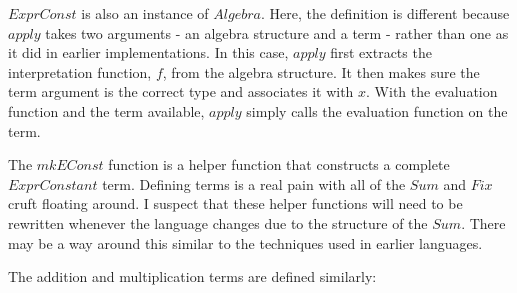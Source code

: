 \documentclass[10pt]{article}
\newcommand{\Conid}[1]{\mathit{#1}}
\newcommand{\Varid}[1]{\mathit{#1}}
\begin{document}
\ensuremath{\Conid{ExprConst}} is also an instance of \ensuremath{\Conid{Algebra}}.  Here, the definition is
different because \ensuremath{\Varid{apply}} takes two arguments - an algebra structure
and a term - rather than one as it did in earlier implementations.  In
this case, \ensuremath{\Varid{apply}} first extracts the interpretation function, \ensuremath{\Varid{f}},
from the algebra structure.  It then makes sure the term argument is
the correct type and associates it with \ensuremath{\Varid{x}}. With the evaluation
function and the term available, \ensuremath{\Varid{apply}} simply calls the
evaluation function on the term.

The \ensuremath{\Varid{mkEConst}} function is a helper function that constructs a
complete \ensuremath{\Conid{ExprConstant}} term.  Defining terms is a real pain with all
of the \ensuremath{\Conid{Sum}} and \ensuremath{\Conid{Fix}} cruft floating around.  I suspect that these
helper functions will need to be rewritten whenever the language
changes due to the structure of the \ensuremath{\Conid{Sum}}.  There may be a way around
this similar to the techniques used in earlier languages.

The addition and multiplication terms are defined similarly:
\end{document}
